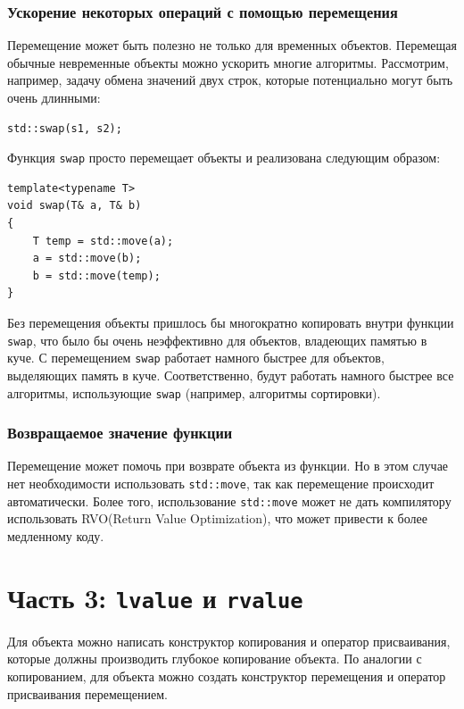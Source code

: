 \documentclass{article}
\begin{document}
\subsubsection*{Ускорение некоторых операций с помощью перемещения}
Перемещение может быть полезно не только для временных объектов. Перемещая обычные невременные объекты можно ускорить многие алгоритмы. Рассмотрим, например, задачу обмена значений двух строк, которые потенциально могут быть очень длинными:
\begin{lstlisting}
std::swap(s1, s2);
\end{lstlisting}
Функция \texttt{swap} просто перемещает объекты и реализована следующим образом:
\begin{lstlisting}
template<typename T> 
void swap(T& a, T& b) 
{
    T temp = std::move(a);
    a = std::move(b);
    b = std::move(temp);
}
\end{lstlisting}
Без перемещения объекты пришлось бы многократно копировать внутри функции \texttt{swap}, что было бы очень неэффективно для объектов, владеющих памятью в куче. С перемещением \texttt{swap} работает намного быстрее для объектов, выделяющих память в куче. Соответственно, будут работать намного быстрее все алгоритмы, использующие \texttt{swap} (например, алгоритмы сортировки).

\subsubsection*{Возвращаемое значение функции}
Перемещение может помочь при возврате объекта из функции. Но в этом случае нет необходимости использовать \texttt{std::move}, так как перемещение происходит автоматически. Более того, использование \texttt{std::move} может не дать компилятору использовать RVO(Return Value Optimization), что может привести к более медленному коду.


\newpage
\section*{Часть 3: \texttt{lvalue} и \texttt{rvalue}}


\newpage

Для объекта можно написать конструктор копирования и оператор присваивания, которые должны производить глубокое копирование объекта. По аналогии с копированием, для объекта можно создать конструктор перемещения и оператор присваивания перемещением.
\end{document}
